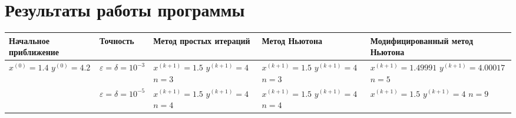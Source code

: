 \section{Результаты работы программы}

\begin{table}[h!]
	\begin{tabular}{|p{12ex}|l|p{20ex}|p{20ex}|p{20ex}|}
		\hline
		Начальное приближение                                      & Точность                            & Метод простых итераций & Метод Ньютона & Модифицированный метод Ньютона \\ \hline
		\(x^{(0)} = 1.4 \) \newline \(y^{(0)} = 4.2\)              &                                                                                                               %
		\(\varepsilon = \delta = 10^{-3} \)                        &                                                                                                               %
		\(x^{(k+1)}=1.5\) \newline \(y^{(k+1)}=4\) \newline\(n=3\) &                                                                                                               %
		\(x^{(k+1)}=1.5\) \newline \(y^{(k+1)}=4\) \newline\(n=3\) &                                                                                                               %
		\(x^{(k+1)}=1.49991\) \newline \(y^{(k+1)}=4.00017\) \newline\(n=5\)                                                                                                       \\ \cline{2-5}
		                                                           & \(\varepsilon = \delta = 10^{-5} \) &                                                                         %
		\(x^{(k+1)}=1.5\) \newline \(y^{(k+1)}=4\) \newline\(n=4\) &                                                                                                               %
		\(x^{(k+1)}=1.5\) \newline \(y^{(k+1)}=4\) \newline\(n=4\) &                                                                                                               %
		\(x^{(k+1)}=1.5\) \newline \(y^{(k+1)}=4\) \newline\(n=9\)                                                                                                                 \\ \hline


\end{tabular}
\end{table}
